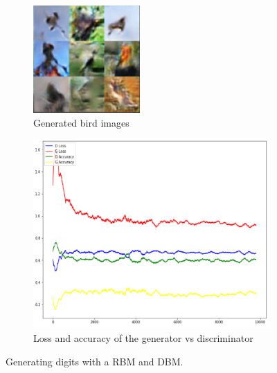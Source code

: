 \documentclass[a4paper,10pt]{article}
\begin{document}
\begin{figure}[h]
	\begin{subfigure}[b]{0.49\textwidth}
		\centering
		\includegraphics[width=0.8\linewidth]{birds.png}
		\caption{Generated bird images}
		\label{fig:birds}
	\end{subfigure}	 	
	\begin{subfigure}[b]{0.49\textwidth}
		\centering
		\includegraphics[width=1.0\linewidth]{GAN_acc.png}
		\caption{Loss and accuracy of the generator vs discriminator}
		\label{fig:GAN_accuracy}
	\end{subfigure}	
	\caption{Generating digits with a RBM and DBM.}
	\label{fig:compareDBM2}
\end{figure}
\end{document}
